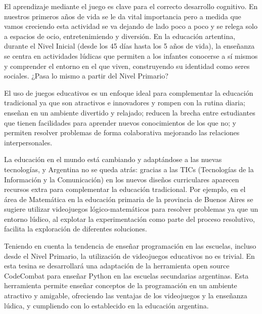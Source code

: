 El aprendizaje mediante el juego es clave para el correcto desarrollo cognitivo. En nuestros primeros años de vida se le da vital importancia pero a medida que vamos creciendo esta actividad se va dejando de lado poco a poco y se relega solo a espacios de ocio, entretenimiendo y diversión. En la educación artentina, durante el Nivel Inicial (desde los 45 días hasta los 5 años de vida), la enseñanza se centra en actividades lúdicas que permiten a los infantes conocerse a sí mismos y comprender el entorno en el que viven, construyendo su identidad como seres sociales. ¿Pasa lo mismo a partir del Nivel Primario?

El uso de juegos educativos es un enfoque ideal para complementar la educación tradicional ya que son atractivos e innovadores y rompen con la rutina diaria; enseñan en un ambiente divertido y relajado; reducen la brecha entre estudiantes que tienen facilidades para aprender nuevos conocimientos de los que no; y permiten resolver problemas de forma colaborativa mejorando las relaciones interpersonales.

La educación en el mundo está cambiando y adaptándose a las nuevas tecnologías, y Argentina no se queda atrás: gracias a las TICs (Tecnologías de la Información y la Comunicación) en los nuevos diseños curriculares aparecen recursos extra para complementar la educación tradicional. Por ejemplo, en el área de Matemática en la educación primaria de la provincia de Buenos Aires \cite{educacionPrimaria2018} se sugiere utilizar videojuegos lógico-matemáticos para resolver problemas ya que un entorno lúdico, al explotar la experimentación como parte del proceso resolutivo, facilita la exploración de diferentes soluciones.

Teniendo en cuenta la tendencia de enseñar programación en las escuelas, incluso desde el Nivel Primario, la utilización de videojuegos educativos no es trivial. En esta tesina se desarrollará una adaptación de la herramienta open source CodeCombat para enseñar Python en las escuelas secundarias argentinas. Esta herramienta permite enseñar conceptos de la programación en un ambiente atractivo y amigable, ofreciendo las ventajas de los videojuegos y la enseñanza lúdica, y cumpliendo con lo establecido en la educación argentina.
